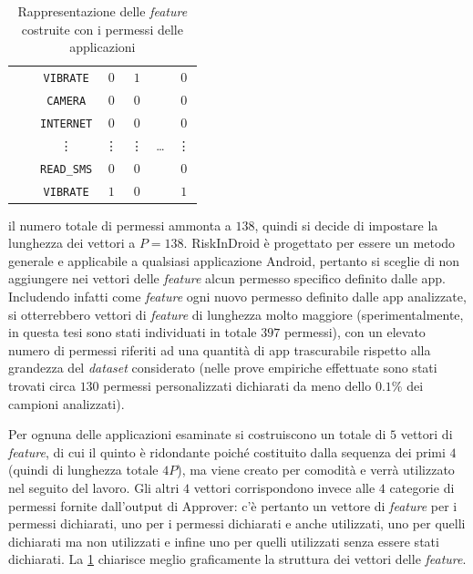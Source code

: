 \documentclass[12pt,a4paper,oneside]{article}
\begin{document}
\begin{table}[!htb]
\begin{tabular}{|c|c|c||cccc|}
        && \texttt{VIBRATE} & $0$ & $1$ && $0$ \\
        \cline{2-7}
        & \multirow{5}{*}{\rotatebox{90}{\parbox{3cm}{\centering Non dichiarati ma utilizzati}\hspace{.3\normalbaselineskip}}} &
        \texttt{CAMERA} & $0$ & $0$ && $0$ \\
        && \texttt{INTERNET} & $0$ & $0$ && $0$ \\
        && \vdots & \vdots & \vdots & \dots & \vdots \\
        && \texttt{READ\_SMS} & $0$ & $0$ && $0$ \\
        && \texttt{VIBRATE} & $1$ & $0$ && $1$ \\
        \hline
    \end{tabular}
    \caption{Rappresentazione delle \textit{feature} costruite con i permessi delle applicazioni}
    \label{tab:features}
\end{table}
il numero totale di permessi ammonta a $138$, quindi si decide di impostare la lunghezza dei vettori a $P = 138$. RiskInDroid è progettato per essere un metodo generale e applicabile a qualsiasi applicazione Android, pertanto si sceglie di non aggiungere nei vettori delle \textit{feature} alcun permesso specifico definito dalle app. Includendo infatti come \textit{feature} ogni nuovo permesso definito dalle app analizzate, si otterrebbero vettori di \textit{feature} di lunghezza molto maggiore (sperimentalmente, in questa tesi sono stati individuati in totale $397$ permessi), con un elevato numero di permessi riferiti ad una quantità di app trascurabile rispetto alla grandezza del \textit{dataset} considerato (nelle prove empiriche effettuate sono stati trovati circa $130$ permessi personalizzati dichiarati da meno dello $0.1\%$ dei campioni analizzati).

Per ognuna delle applicazioni esaminate si costruiscono un totale di $5$ vettori di \textit{feature}, di cui il quinto è ridondante poiché costituito dalla sequenza dei primi $4$ (quindi di lunghezza totale $4P$), ma viene creato per comodità e verrà utilizzato nel seguito del lavoro. Gli altri $4$ vettori corrispondono invece alle $4$ categorie di permessi fornite dall'output di Approver: c'è pertanto un vettore di \textit{feature} per i permessi dichiarati, uno per i permessi dichiarati e anche utilizzati, uno per quelli dichiarati ma non utilizzati e infine uno per quelli utilizzati senza essere stati dichiarati. La \cref{tab:features} chiarisce meglio graficamente la struttura dei vettori delle \textit{feature}.
\end{document}
